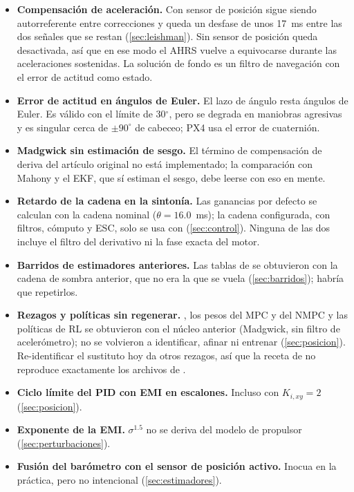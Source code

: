 \begin{itemize}
\item \textbf{Compensación de aceleración.} Con sensor de posición sigue
siendo autorreferente entre correcciones y queda un desfase de unos 17~ms
entre las dos señales que se restan (\cref{sec:leishman}). Sin sensor de
posición queda desactivada, así que en ese modo el AHRS vuelve a
equivocarse durante las aceleraciones sostenidas. La solución de fondo es
un filtro de navegación con el error de actitud como estado.
\item \textbf{Error de actitud en ángulos de Euler.} El lazo de ángulo resta
ángulos de Euler. Es válido con el límite de 30$^\circ$, pero se degrada en
maniobras agresivas y es singular cerca de $\pm90^\circ$ de cabeceo; PX4
usa el error de cuaternión.
\item \textbf{Madgwick sin estimación de sesgo.} El término de compensación
de deriva del artículo original no está implementado; la comparación con
Mahony y el EKF, que sí estiman el sesgo, debe leerse con eso en mente.
\item \textbf{Retardo de la cadena en la sintonía.} Las ganancias por
defecto se calculan con la cadena nominal ($\theta=16.0$~ms); la cadena
configurada, con filtros, cómputo y ESC, solo se usa con
 (\cref{sec:control}). Ninguna de las dos incluye
el filtro del derivativo ni la fase exacta del motor.
\item \textbf{Barridos de estimadores anteriores.} Las tablas de
 se obtuvieron con la cadena de sombra anterior, que
no era la que se vuela (\cref{sec:barridos}); habría que repetirlos.
\item \textbf{Rezagos y políticas sin regenerar.} , los
pesos del MPC y del NMPC y las políticas de RL se obtuvieron con el núcleo
anterior (Madgwick, sin filtro de acelerómetro); no se volvieron a
identificar, afinar ni entrenar (\cref{sec:posicion}). Re-identificar el
sustituto hoy da otros rezagos, así que la receta de  no
reproduce exactamente los archivos de .
\item \textbf{Ciclo límite del PID con EMI en escalones.} Incluso con
$K_{i,xy}=2$ (\cref{sec:posicion}).
\item \textbf{Exponente de la EMI.} $\sigma^{1.5}$ no se deriva del modelo de
propulsor (\cref{sec:perturbaciones}).
\item \textbf{Fusión del barómetro con el sensor de posición activo.} Inocua
en la práctica, pero no intencional (\cref{sec:estimadores}).
\end{itemize}

